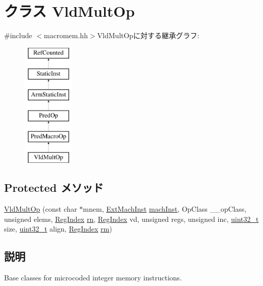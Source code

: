 \hypertarget{classArmISA_1_1VldMultOp}{
\section{クラス VldMultOp}
\label{classArmISA_1_1VldMultOp}
}


{\ttfamily \#include $<$macromem.hh$>$}VldMultOpに対する継承グラフ:\begin{figure}[H]
\begin{center}
\leavevmode
\includegraphics[height=6cm]{classArmISA_1_1VldMultOp}
\end{center}
\end{figure}
\subsection*{Protected メソッド}
\begin{DoxyCompactItemize}
\item 
\hyperlink{classArmISA_1_1VldMultOp_a754883decfb95a4817c7650fc301a435}{VldMultOp} (const char $\ast$mnem, \hyperlink{classStaticInst_a5605d4fc727eae9e595325c90c0ec108}{ExtMachInst} \hyperlink{classStaticInst_a744598b194ca3d4201d9414ce4cc4af4}{machInst}, OpClass \_\-\_\-opClass, unsigned elems, \hyperlink{classStaticInst_a36d25e03e43fa3bb4c5482cbefe5e0fb}{RegIndex} \hyperlink{namespaceArmISA_adf8c6c579ad8729095a637a4f2181211}{rn}, \hyperlink{classStaticInst_a36d25e03e43fa3bb4c5482cbefe5e0fb}{RegIndex} vd, unsigned regs, unsigned inc, \hyperlink{Type_8hh_a435d1572bf3f880d55459d9805097f62}{uint32\_\-t} size, \hyperlink{Type_8hh_a435d1572bf3f880d55459d9805097f62}{uint32\_\-t} align, \hyperlink{classStaticInst_a36d25e03e43fa3bb4c5482cbefe5e0fb}{RegIndex} \hyperlink{namespaceArmISA_ad546c2cf2168cf2d8ac21b2a9f485e82}{rm})
\end{DoxyCompactItemize}


\subsection{説明}
Base classes for microcoded integer memory instructions. 

